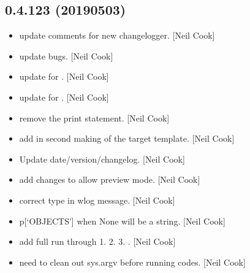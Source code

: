 \documentclass[a4paper,10pt,english]{report}
\begin{document}
\subsection{0.4.123 (2019\sphinxhyphen{}05\sphinxhyphen{}03)}
\label{\detokenize{misc/changelog:id156}}\begin{itemize}
\item {} 
 \sphinxhyphen{} update comments for new changelogger. {[}Neil Cook{]}

\item {} 
 \sphinxhyphen{} update bugs. {[}Neil Cook{]}

\item {} 
 \sphinxhyphen{} update for . {[}Neil Cook{]}

\item {} 
 \sphinxhyphen{} update for . {[}Neil Cook{]}

\item {} 
 \sphinxhyphen{} remove the print statement. {[}Neil Cook{]}

\item {} 
 \sphinxhyphen{} add in second making of the target template.
{[}Neil Cook{]}

\item {} 
Update date/version/changelog. {[}Neil Cook{]}

\item {} 
 \sphinxhyphen{} add changes to allow preview mode. {[}Neil Cook{]}

\item {} 
 \sphinxhyphen{} correct type in wlog message. {[}Neil Cook{]}

\item {} 
 \sphinxhyphen{} p{[}‘OBJECTS’{]} when None will be a string. {[}Neil
Cook{]}

\item {} 
 \sphinxhyphen{} add full run through 1.  2. 
3. . {[}Neil Cook{]}

\item {} 
 \sphinxhyphen{} need to clean out sys.argv before running codes.
{[}Neil Cook{]}


\end{itemize}
\end{document}
